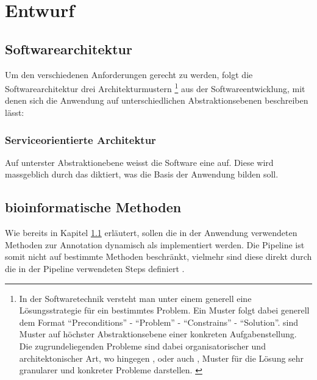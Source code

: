 \chapter{Entwurf}

\section{Softwarearchitektur}\label{chp:softwarearchitektur}
Um den verschiedenen Anforderungen gerecht zu werden,
folgt die Softwarearchitektur drei Architekturmustern
\footnote{
In der Softwaretechnik versteht man unter einem  generell eine
Lösungsstrategie für ein bestimmtes Problem.
Ein Muster folgt dabei generell dem Format \enquote{Preconditions} -
\enquote{Problem} - \enquote{Constrains} - \enquote{Solution}.
\citep{beck_patterns_1994}
 sind Muster auf höchster Abstraktionsebene
einer konkreten Aufgabenstellung.
Die zugrundeliegenden Probleme sind dabei organisatorischer und
architektonischer Art, wo hingegen , oder
auch , Muster für die Lösung sehr granularer und konkreter
Probleme darstellen.
\citep{buschmann_pattern-oriented_1996}
}
aus der
Softwareentwicklung, mit denen sich die Anwendung auf unterschiedlichen
Abstraktionsebenen beschreiben lässt:





\subsection{Serviceorientierte Architektur}
Auf unterster Abstraktionebene weisst die Software eine
 auf.
Diese wird massgeblich durch das  diktiert, was die Basis
der Anwendung bilden soll.



\section{bioinformatische Methoden}
Wie bereits in Kapitel \ref{chp:softwarearchitektur} erläutert, sollen die in
der Anwendung verwendeten Methoden zur Annotation dynamisch als 
implementiert werden. Die Pipeline ist somit nicht auf bestimmte Methoden
beschränkt, vielmehr sind diese direkt durch die in der Pipeline verwendeten
Steps definiert .


